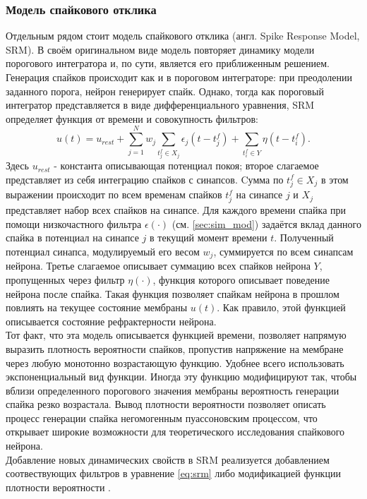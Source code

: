 \documentclass[a4paper,10pt]{article}
\begin{document}
\subsubsection{Модель спайкового отклика}\label{sec:srm}
\indent Отдельным рядом стоит модель спайкового отклика (англ. Spike Response Model, SRM). В своём оригинальном виде модель повторяет динамику модели порогового интегратора и, по сути, является его приближенным решением.\\ 
\indent Генерация спайков происходит как и в пороговом интеграторе: при преодолении заданного порога, нейрон генерирует спайк. Однако, тогда как пороговый интегратор представляется в виде дифференциального уравнения, SRM определяет функция от времени и совокупность фильтров:
\begin{equation}\label{eq:srm}
u(t) = u_{rest} + \sum_{j=1}^N w_{j} \sum_{t^{f}_{j} \in X_{j}} \epsilon_{j}(t-t^{f}_{j}) + \sum_{t^{f}_{i}\in Y}\eta(t-t^{f}_{i}).
\end{equation}
Здесь $u_{rest}$ - константа описывающая потенциал покоя; второе слагаемое представляет из себя интеграцию спайков с синапсов. Cумма по $t^{f}_{j} \in X_{j}$ в этом выражении происходит по всем временам спайков $t^{f}_{j}$ на синапсе $j$ и $X_{j}$ представляет набор всех спайков на синапсе. Для каждого времени спайка при помощи низкочастного фильтра $\epsilon(\cdot)$ (см. \ref{sec:sim_mod}) задаётся вклад данного спайка в потенциал на синапсе $j$ в текущий момент времени $t$. Полученный потенциал синапса, модулируемый его весом $w_{j}$, суммируется по всем синапсам нейрона. Третье слагаемое описывает суммацию всех спайков нейрона $Y$, пропущенных через фильтр $\eta(\cdot)$, функция которого описывает поведение нейрона после спайка. Такая функция позволяет спайкам нейрона в прошлом повлиять на текущее состояние мембраны $u(t)$. Как правило, этой функцией описывается состояние рефрактерности нейрона.\\
\indent Тот факт, что эта модель описывается функцией времени, позволяет напрямую выразить плотность вероятности спайков, пропустив напряжение на мембране через любую монотонно возрастающую функцию. Удобнее всего использовать экспоненциальный вид функции. Иногда эту функцию модифицируют так, чтобы вблизи определенного порогового значения мембраны вероятность генерации спайка резко возрастала. Вывод плотности вероятности позволяет описать процесс генерации спайка негомогенным пуассоновским процессом, что открывает широкие возможности для теоретического исследования спайкового нейрона.\\
\indent Добавление новых динамических свойств в SRM реализуется добавлением соотвествующих фильтров в уравнение \eqref{eq:srm} либо модификацией функции плотности вероятности \cite{TripleAdapt,AdaptThesis}. 
\end{document}
